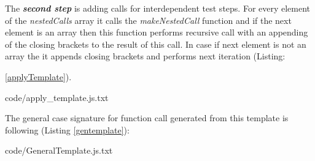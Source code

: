 The \textit{\textbf{second step}} is adding calls for interdependent test steps. For every  element of the \textit{nestedCalls} array it calls the  \textit{makeNestedCall} function and if the next element is an array then this function performs recursive call with an appending of the closing brackets to the result of this call. In case if next element is not an array the it appends closing brackets and performs next iteration (Listing: {\ref{applyTemplate}).




{code/apply_template.js.txt}


%
%


The general case signature for function call generated from this template is following (Listing \ref{gentemplate}):

{code/GeneralTemplate.js.txt}

}
